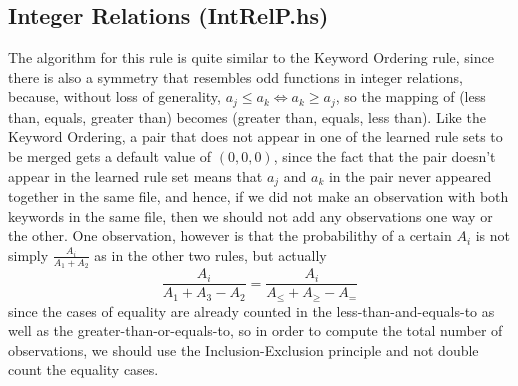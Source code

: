 \documentclass[12pt]{article}
\begin{document}
\subsection{Integer Relations (IntRelP.hs)}
The algorithm for this rule is quite similar to the Keyword Ordering rule, since there is also a symmetry that resembles odd functions in integer relations, because, without loss of generality, $a_j \leq a_k \Leftrightarrow a_k \geq a_j$, so the mapping of (less than, equals, greater than) becomes (greater than, equals, less than). Like the Keyword Ordering, a pair that does not appear in one of the learned rule sets to be merged gets a default value of $(0, 0, 0)$, since the fact that the pair doesn't appear in the learned rule set means that $a_j$ and $a_k$ in the pair never appeared together in the same file, and hence, if we did not make an observation with both keywords in the same file, then we should not add any observations one way or the other. One observation, however is that the probabilithy of a certain $A_i$ is not simply $\frac{A_i}{A_1 + A_2}$ as in the other two rules, but actually
\[
\frac{A_i}{A_{1} + A_{3} - A_{2}} =
\frac{A_i}{A_{\leq} + A_{\geq} - A_{=}}
\]
since the cases of equality are already counted in the less-than-and-equals-to as well as the greater-than-or-equals-to, so in order to compute the total number of observations, we should use the Inclusion-Exclusion principle and not double count the equality cases.
\end{document}
